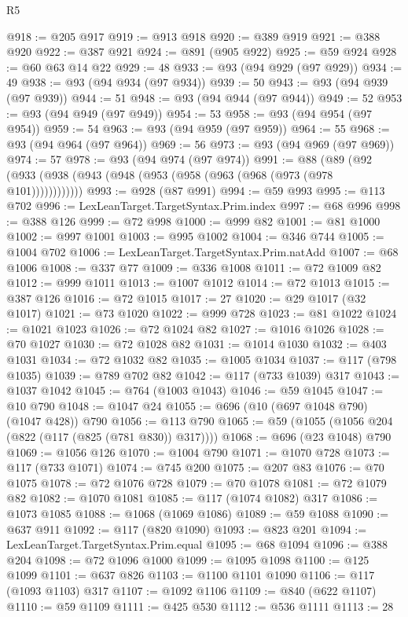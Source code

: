 \begin{lexlean}{R5}
\begin{coremodule}
{{{{{{{{{{{{{{{{{{{{{{{{{{{{{{{{{{{{{{{{{{{{{{{{{{{{{{{{{{{{{{{{{{{{{{{{{{{{{{{{{{{{{{{{{{{{@918 := @205 @917
@919 := @913 @918
@920 := @389 @919
@921 := @388 @920
@922 := @387 @921
@924 := @891 (@905 @922)
@925 := @59 @924
@928 := @60 @63 @14 @22
@929 := 48
@933 := @93 (@94 @929 (@97 @929))
@934 := 49
@938 := @93 (@94 @934 (@97 @934))
@939 := 50
@943 := @93 (@94 @939 (@97 @939))
@944 := 51
@948 := @93 (@94 @944 (@97 @944))
@949 := 52
@953 := @93 (@94 @949 (@97 @949))
@954 := 53
@958 := @93 (@94 @954 (@97 @954))
@959 := 54
@963 := @93 (@94 @959 (@97 @959))
@964 := 55
@968 := @93 (@94 @964 (@97 @964))
@969 := 56
@973 := @93 (@94 @969 (@97 @969))
@974 := 57
@978 := @93 (@94 @974 (@97 @974))
@991 := @88 (@89 (@92 (@933 (@938 (@943 (@948 (@953 (@958 (@963 (@968 (@973 (@978 @101))))))))))))
@993 := @928 (@87 @991)
@994 := @59 @993
@995 := @113 @702
@996 := LexLeanTarget.TargetSyntax.Prim.index
@997 := @68 @996
@998 := @388 @126
@999 := @72 @998
@1000 := @999 @82
@1001 := @81 @1000
@1002 := @997 @1001
@1003 := @995 @1002
@1004 := @346 @744
@1005 := @1004 @702
@1006 := LexLeanTarget.TargetSyntax.Prim.natAdd
@1007 := @68 @1006
@1008 := @337 @77
@1009 := @336 @1008
@1011 := @72 @1009 @82
@1012 := @999 @1011
@1013 := @1007 @1012
@1014 := @72 @1013
@1015 := @387 @126
@1016 := @72 @1015
@1017 := 27
@1020 := @29 @1017 (@32 @1017)
@1021 := @73 @1020
@1022 := @999 @728
@1023 := @81 @1022
@1024 := @1021 @1023
@1026 := @72 @1024 @82
@1027 := @1016 @1026
@1028 := @70 @1027
@1030 := @72 @1028 @82
@1031 := @1014 @1030
@1032 := @403 @1031
@1034 := @72 @1032 @82
@1035 := @1005 @1034
@1037 := @117 (@798 @1035)
@1039 := @789 @702 @82
@1042 := @117 (@733 @1039) @317
@1043 := @1037 @1042
@1045 := @764 (@1003 @1043)
@1046 := @59 @1045
@1047 := @10 @790
@1048 := @1047 @24
@1055 := @696 (@10 (@697 @1048 @790) (@1047 @428)) @790
@1056 := @113 @790
@1065 := @59 (@1055 (@1056 @204 (@822 (@117 (@825 (@781 @830)) @317))))
@1068 := @696 (@23 @1048) @790
@1069 := @1056 @126
@1070 := @1004 @790
@1071 := @1070 @728
@1073 := @117 (@733 @1071)
@1074 := @745 @200
@1075 := @207 @83
@1076 := @70 @1075
@1078 := @72 @1076 @728
@1079 := @70 @1078
@1081 := @72 @1079 @82
@1082 := @1070 @1081
@1085 := @117 (@1074 @1082) @317
@1086 := @1073 @1085
@1088 := @1068 (@1069 @1086)
@1089 := @59 @1088
@1090 := @637 @911
@1092 := @117 (@820 @1090)
@1093 := @823 @201
@1094 := LexLeanTarget.TargetSyntax.Prim.equal
@1095 := @68 @1094
@1096 := @388 @204
@1098 := @72 @1096 @1000
@1099 := @1095 @1098
@1100 := @125 @1099
@1101 := @637 @826
@1103 := @1100 @1101 @1090
@1106 := @117 (@1093 @1103) @317
@1107 := @1092 @1106
@1109 := @840 (@622 @1107)
@1110 := @59 @1109
@1111 := @425 @530
@1112 := @536 @1111
@1113 := 28
}}}}}}}}}}}}}}}}}}}}}}}}}}}}}}}}}}}}}}}}}}}}}}}}}}}}}}}}}}}}}}}}}}}}}}}}}}}}}}}}}}}}}}}}}}}}
\end{coremodule}
\end{lexlean}
